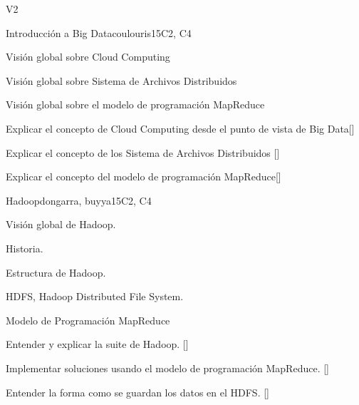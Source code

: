 \begin{syllabus}
\begin{competences}{V2}
    \item {}
    \item {} 
    \item {} 
    \item {} 
    \item {} 
\end{competences}

\begin{unit}{Introducción a Big Data}{}{coulouris}{15}{C2, C4}
\begin{topics}%
        \item Visión global sobre Cloud Computing
        \item Visión global sobre Sistema de Archivos Distribuidos%
        \item Visión global sobre el modelo de programación MapReduce%
\end{topics}
\begin{learningoutcomes}%
        \item Explicar el concepto de Cloud Computing desde el punto de vista de Big Data[\Familiarity] %
        \item Explicar el concepto de los Sistema de Archivos Distribuidos [\Familiarity] %
        \item Explicar el concepto del modelo de programación MapReduce[\Familiarity] %
\end{learningoutcomes}%
\end{unit}

\begin{unit}{Hadoop}{}{dongarra, buyya}{15}{C2, C4}
\begin{topics}
    \item Visión global de Hadoop.
    \item Historia.
    \item Estructura de Hadoop.
    \item HDFS, Hadoop Distributed File System.
    \item Modelo de Programación MapReduce
\end{topics}
\begin{learningoutcomes}
      \item Entender y explicar la suite de Hadoop. [\Familiarity]
      \item Implementar soluciones usando el modelo de programación MapReduce. [\Usage]
      \item Entender la forma como se guardan los datos en el HDFS. [\Familiarity] %
\end{learningoutcomes}
\end{unit}


\end{syllabus}
